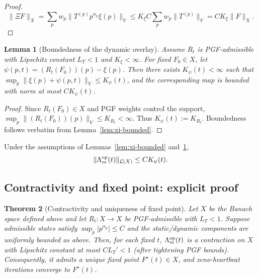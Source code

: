 \documentclass[11pt, a4paper]{article}
\newtheorem{theorem}{Theorem}
\newtheorem{lemma}[theorem]{Lemma}
\begin{document}
\begin{proof}
\[
\|\Xi F\|_X = \sum_p w_p \|T^{(p)} p^{\alpha_p} \xi(p)\|_V \le K_\xi C \sum_p w_p \|T^{(p)}\|_V = C K_\xi \|F\|_X.
\]
\end{proof}

\begin{lemma}[Boundedness of the dynamic overlay]
\label{lem:psi-bounded}
Assume \(R_t\) is PGF-admissible with Lipschitz constant \(L_T < 1\) and \(K_\xi < \infty\). For fixed \(F_0 \in X\), let \(\psi(p,t) = (R_t(F_0))(p) - \xi(p)\). Then there exists \(K_\psi(t) < \infty\) such that \(\sup_p \|\xi(p) + \psi(p,t)\|_V \le K_\psi(t)\), and the corresponding map is bounded with norm at most \(C K_\psi(t)\).
\end{lemma}

\begin{proof}
Since \(R_t(F_0) \in X\) and PGF weights control the support, \(\sup_p \|(R_t(F_0))(p)\|_V \le K_{R_t} < \infty\). Thus \(K_\psi(t) := K_{R_t}\). Boundedness follows verbatim from Lemma~\ref{lem:xi-bounded}.
\end{proof}

\begin{proposition}
Under the assumptions of Lemmas~\ref{lem:xi-bounded} and~\ref{lem:psi-bounded},
\[
\|\Lambda_m^{\rm op}(t)\|_{\mathcal{L}(X)} \le C K_\psi(t).
\]
\end{proposition}

\subsection{Contractivity and fixed point: explicit proof}

\begin{theorem}[Contractivity and uniqueness of fixed point]
Let \(X\) be the Banach space defined above and let \(R_t : X \to X\) be PGF-admissible with \(L_T < 1\). Suppose admissible states satisfy \(\sup_p |p^{\alpha_p}| \le C\) and the static/dynamic components are uniformly bounded as above. Then, for each fixed \(t\), \(\Lambda_m^{\rm op}(t)\) is a contraction on \(X\) with Lipschitz constant at most \(C L_T' < 1\) (after tightening PGF bounds). Consequently, it admits a unique fixed point \(F^\star(t) \in X\), and zeno-heartbeat iterations converge to \(F^\star(t)\).
\end{theorem}
\end{document}
